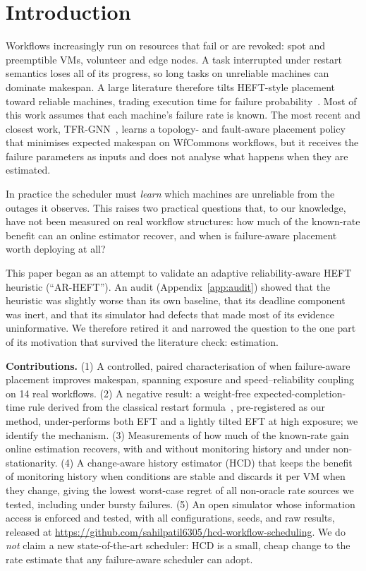 \documentclass[10pt,twocolumn,letterpaper]{article}
\begin{document}
\section{Introduction}
Workflows increasingly run on resources that fail or are revoked: spot and preemptible
VMs, volunteer and edge nodes. A task interrupted under restart semantics loses all of its
progress, so long tasks on unreliable machines can dominate makespan. A large literature
therefore tilts HEFT-style placement~\cite{topcuoglu2002heft} toward reliable machines,
trading execution time for failure probability~\cite{dogan2001trading,dogan2005biobjective,girault2008reliability}.
Most of this work assumes that each machine's failure rate is known. The most recent and
closest work, TFR-GNN~\cite{yang2026tfrgnn}, learns a topology- and fault-aware placement
policy that minimises expected makespan on WfCommons workflows, but it receives the failure
parameters as inputs and does not analyse what happens when they are estimated.

In practice the scheduler must \emph{learn} which machines are unreliable from the outages it
observes. This raises two practical questions that, to our knowledge, have not been
measured on real workflow structures: how much of the known-rate benefit can an online
estimator recover, and when is failure-aware placement worth deploying at all?

This paper began as an attempt to validate an adaptive reliability-aware HEFT heuristic
(``AR-HEFT''). An audit (Appendix~\ref{app:audit}) showed that the heuristic was slightly
worse than its own baseline, that its deadline component was inert, and that its
simulator had defects that made most of its evidence uninformative. We therefore retired
it and narrowed the question to the one part of its motivation that survived the
literature check: estimation.

\textbf{Contributions.}
(1) A controlled, paired characterisation of when failure-aware placement improves makespan,
spanning exposure and speed--reliability coupling on 14 real workflows.
(2) A negative result: a weight-free expected-completion-time rule derived from the classical
restart formula~\cite{aupy2016checkpointing}, pre-registered as our method, under-performs both
EFT and a lightly tilted EFT at high exposure; we identify the mechanism.
(3) Measurements of how much of the known-rate gain online estimation recovers, with and without
monitoring history and under non-stationarity.
(4) A change-aware history estimator (\textsf{HCD}) that keeps the benefit of monitoring history when
conditions are stable and discards it per VM when they change, giving the lowest worst-case regret of
all non-oracle rate sources we tested, including under bursty failures.
(5) An open simulator whose information access is enforced and tested, with all
configurations, seeds, and raw results, released at
\url{https://github.com/sahilpatil6305/hcd-workflow-scheduling}.
We do \emph{not} claim a new state-of-the-art scheduler: \textsf{HCD} is a small, cheap change to the rate
estimate that any failure-aware scheduler can adopt.
\end{document}
